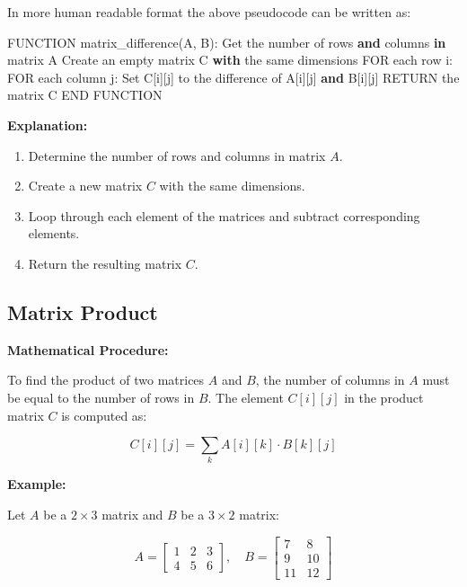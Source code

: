 \documentclass[
  letterpaper,
  DIV=11,
  numbers=noendperiod]{scrreprt}
\newenvironment{Shaded}{\begin{snugshade}}{\end{snugshade}}
\newcommand{\ControlFlowTok}[1]{\textcolor[rgb]{0.00,0.23,0.31}{\textbf{#1}}}
\newcommand{\KeywordTok}[1]{\textcolor[rgb]{0.00,0.23,0.31}{\textbf{#1}}}
\newcommand{\NormalTok}[1]{\textcolor[rgb]{0.00,0.23,0.31}{#1}}
\providecommand{\tightlist}{%
  \setlength{\itemsep}{0pt}\setlength{\parskip}{0pt}}\usepackage{longtable,booktabs,array}
\theoremstyle{plain}
\theoremstyle{definition}
\theoremstyle{remark}
\begin{document}
In more human readable format the above pseudocode can be written as:

\begin{Shaded}
\begin{Highlighting}[]
\NormalTok{FUNCTION matrix\_difference(A, B):}
\NormalTok{    Get the number of rows }\KeywordTok{and}\NormalTok{ columns }\KeywordTok{in}\NormalTok{ matrix A}
\NormalTok{    Create an empty matrix C }\ControlFlowTok{with}\NormalTok{ the same dimensions}
\NormalTok{    FOR each row i:}
\NormalTok{        FOR each column j:}
\NormalTok{            Set C[i][j] to the difference of A[i][j] }\KeywordTok{and}\NormalTok{ B[i][j]}
\NormalTok{    RETURN the matrix C}
\NormalTok{END FUNCTION}
\end{Highlighting}
\end{Shaded}

\textbf{Explanation:}

\begin{enumerate}
\def\labelenumi{\arabic{enumi}.}
\tightlist
\item
  Determine the number of rows and columns in matrix \(A\).
\item
  Create a new matrix \(C\) with the same dimensions.
\item
  Loop through each element of the matrices and subtract corresponding
  elements.
\item
  Return the resulting matrix \(C\).
\end{enumerate}

\subsection{Matrix Product}\label{matrix-product}

\textbf{Mathematical Procedure:}

To find the product of two matrices \(A\) and \(B\), the number of
columns in \(A\) must be equal to the number of rows in \(B\). The
element \(C[i][j]\) in the product matrix \(C\) is computed as:

\[C[i][j] = \sum_{k} A[i][k] \cdot B[k][j]\]

\textbf{Example:}

Let \(A\) be a \(2 \times 3\) matrix and \(B\) be a \(3 \times 2\)
matrix:

\[A = \begin{bmatrix} 1 & 2 & 3 \\ 4 & 5 & 6 \end{bmatrix}, \quad B = \begin{bmatrix} 7 & 8 \\ 9 & 10 \\ 11 & 12 \end{bmatrix}\]
\end{document}
